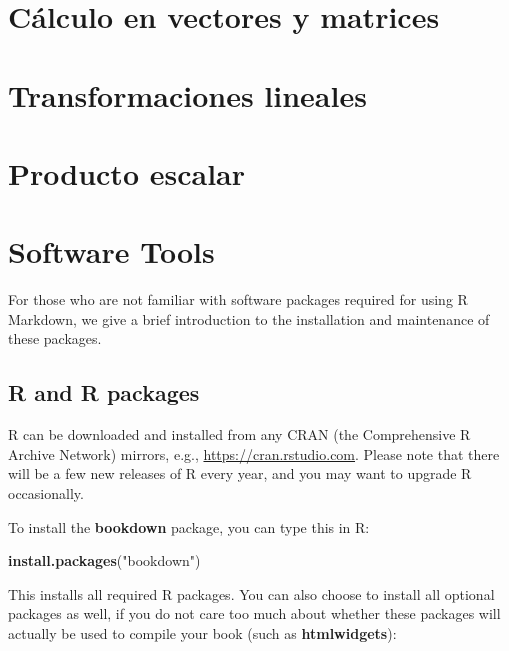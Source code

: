 \documentclass[12pt,]{krantz}
\makeatletter
\newenvironment{Shaded}{\begin{snugshade}}{\end{snugshade}}
\newcommand{\KeywordTok}[1]{\textcolor[rgb]{0.13,0.29,0.53}{\textbf{#1}}}
\newcommand{\StringTok}[1]{\textcolor[rgb]{0.31,0.60,0.02}{#1}}
\newcommand{\NormalTok}[1]{#1}
\newenvironment{kframe}{%
\medskip{}
\setlength{\fboxsep}{.8em}
 \def\at@end@of@kframe{}%
 \ifinner\ifhmode%
  \def\at@end@of@kframe{\end{minipage}}%
  \begin{minipage}{\columnwidth}%
 \fi\fi%
 \def\FrameCommand##1{\hskip\@totalleftmargin \hskip-\fboxsep
 \colorbox{shadecolor}{##1}\hskip-\fboxsep
     \hskip-\linewidth \hskip-\@totalleftmargin \hskip\columnwidth}%
 \MakeFramed {\advance\hsize-\width
   \@totalleftmargin\z@ \linewidth\hsize
   \@setminipage}}%
 {\par\unskip\endMakeFramed%
 \at@end@of@kframe}
\renewenvironment{Shaded}{\begin{kframe}}{\end{kframe}}
\theoremstyle{definition}
\theoremstyle{definition}
\theoremstyle{definition}
\theoremstyle{remark}
\makeatother
\begin{document}
\chapter{Cálculo en vectores y
matrices}\label{calculo-en-vectores-y-matrices}

\chapter{Transformaciones lineales}\label{transformaciones-lineales}

\chapter{Producto escalar}\label{producto-escalar}

\cleardoublepage 

\appendix {}


\chapter{Software Tools}\label{software-tools}

For those who are not familiar with software packages required for using
R Markdown, we give a brief introduction to the installation and
maintenance of these packages.

\section{R and R packages}\label{r-and-r-packages}

R can be downloaded and installed from any CRAN (the Comprehensive R
Archive Network) mirrors, e.g., \url{https://cran.rstudio.com}. Please
note that there will be a few new releases of R every year, and you may
want to upgrade R occasionally.

To install the \textbf{bookdown} package, you can type this in R:

\begin{Shaded}
\begin{Highlighting}[]
\KeywordTok{install.packages}\NormalTok{(}\StringTok{"bookdown"}\NormalTok{)}
\end{Highlighting}
\end{Shaded}

This installs all required R packages. You can also choose to install
all optional packages as well, if you do not care too much about whether
these packages will actually be used to compile your book (such as
\textbf{htmlwidgets}):
\end{document}
